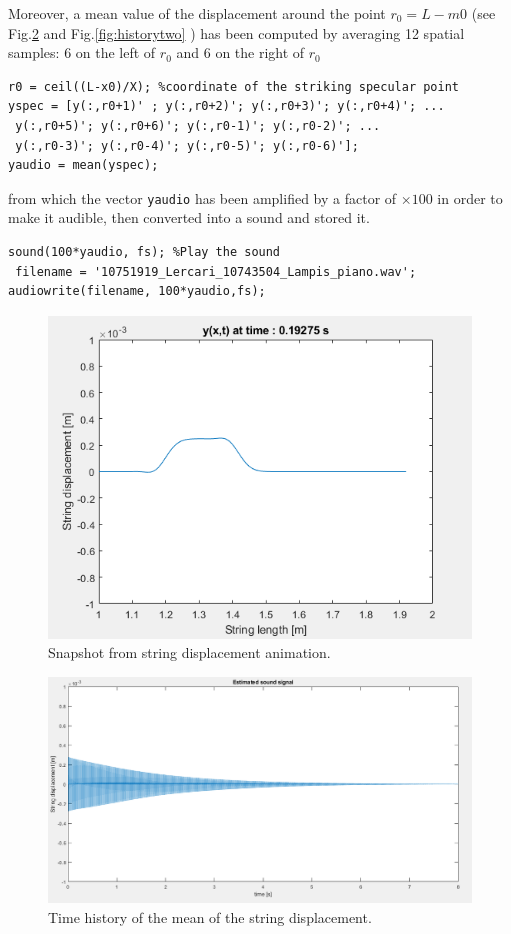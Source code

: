 \documentclass[a4paper]{article}
\begin{document}
Moreover, a mean value of the displacement around the point $r_0 = L - m0$ (see Fig.\ref{fig:historyone} and Fig.\ref{fig:historytwo} ) has been computed by averaging 12 spatial samples: 6 on the left of $r_0$ and 6 on the right of $r_0$

\begin{verbatim}
r0 = ceil((L-x0)/X); %coordinate of the striking specular point
yspec = [y(:,r0+1)' ; y(:,r0+2)'; y(:,r0+3)'; y(:,r0+4)'; ...
 y(:,r0+5)'; y(:,r0+6)'; y(:,r0-1)'; y(:,r0-2)'; ...
 y(:,r0-3)'; y(:,r0-4)'; y(:,r0-5)'; y(:,r0-6)'];
yaudio = mean(yspec);
\end{verbatim}

from which the vector \verb|yaudio| has been amplified by a factor of $\times 100$ in order to make it audible, then converted into a sound and stored it.

\begin{verbatim}
sound(100*yaudio, fs); %Play the sound
 filename = '10751919_Lercari_10743504_Lampis_piano.wav';
audiowrite(filename, 100*yaudio,fs); 
\end{verbatim}

 \begin{figure}[h]
	\centering
	\includegraphics[width=0.75\linewidth]{displacement.png}
	\caption{Snapshot from string displacement animation.}
	\label{fig:displ}
\end{figure}

 \begin{figure}[h]
	\centering
	\includegraphics[width=0.75\linewidth]{sound_two.png}
	\caption{Time history of the mean of the string displacement.}
	\label{fig:historyone}
\end{figure}
\end{document}
